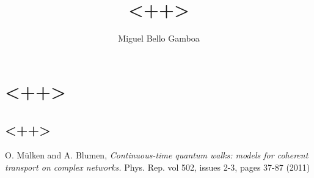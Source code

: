 \documentclass[11pt,a4paper]{article}
\begin{document}
 \title{<++>}
 \author{Miguel Bello Gamboa}
 \maketitle
 
 
 \section{<++>}
 \subsection{<++>}


 \clearpage
 \begin{thebibliography}{4}
  
  O. M\"ulken and A. Blumen,
  \textit{Continuous-time quantum walks: models for coherent transport on complex networks.}
  Phys. Rep. vol 502, issues 2-3, pages 37-87 (2011)
  
 \end{thebibliography} 
 
\end{document}
